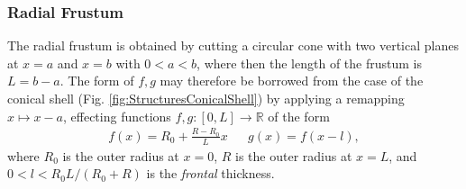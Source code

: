 \documentclass[11pt,dvipsnames]{thesis}
\begin{document}
\subsubsection{Radial Frustum}
The radial frustum is obtained by cutting a circular cone with two vertical planes at $x = a$ and $x = b$ with $0 < a < b$, where then the length of the frustum is $L = b - a$. The form of $f, g$ may therefore be borrowed from the case of the conical shell (Fig. \ref{fig:StructuresConicalShell}) by applying a remapping $x \mapsto x - a$, effecting functions $f, g : [0,L] \to \mathbb{R}$ of the form 
\begin{align}
f(x) = R_0 + \frac{R - R_0}{L} x && g(x) = f(x - l),
\end{align}
where $R_0$ is the outer radius at $x = 0$, $R$ is the outer radius at $x = L$, and $0 < l < R_0 L / (R_0 + R)$ is the \textit{frontal} thickness. 
\end{document}
